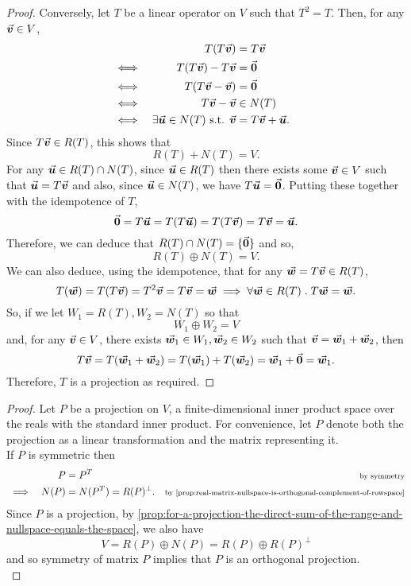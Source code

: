 \documentclass[../MathsNotesBase.tex]{subfiles}
\begin{document}
{\begin{proof}
		\nl
		Conversely, let $T$ be a linear operator on $V$ such that ${ T^2 = T }$. Then, for any ${ \vec{\bm{v}} \in V }$,
		\[\begin{aligned}
			&& T(T\vec{\bm{v}}) &= T\vec{\bm{v}} \\
			&\iff & T(T\vec{\bm{v}}) - T\vec{\bm{v}} &= \vec{\bm{0}} &\text{\scriptsize{}} \\
			&\iff & T(T\vec{\bm{v}} - \vec{\bm{v}}) &= \vec{\bm{0}} &\text{\scriptsize{}} \\
			&\iff & T\vec{\bm{v}} - \vec{\bm{v}} &\in N(T) &\text{\scriptsize{}} \\
			&\iff & \exists \vec{\bm{u}} \in N(T) \text{ s.t. } \vec{\bm{v}} &= T\vec{\bm{v}} + \vec{\bm{u}}.
		\end{aligned}\]
		Since ${ T\vec{\bm{v}} \in R(T) }$, this shows that
		\[ R(T) + N(T) = V. \]
		For any ${ \vec{\bm{u}} \in R(T) \cap N(T) }$, since ${ \vec{\bm{u}} \in R(T) }$ then there exists some ${ \vec{\bm{v}} \in V }$ such that ${ \vec{\bm{u}} = T\vec{\bm{v}} }$ and also, since ${ \vec{\bm{u}} \in N(T) }$, we have ${ T\vec{\bm{u}} = \vec{\bm{0}} }$. Putting these together with the idempotence of $T$,
		\[ \vec{\bm{0}} = T\vec{\bm{u}} = T(T\vec{\bm{u}}) = T(T\vec{\bm{v}}) = T\vec{\bm{v}} = \vec{\bm{u}}. \]
		Therefore, we can deduce that ${ R(T) \cap N(T) = \{\vec{\bm{0}}\} }$ and so,
		\[ R(T) \oplus N(T) = V. \]	
		We can also deduce, using the idempotence, that for any ${ \vec{\bm{w}} = T\vec{\bm{v}} \in R(T) }$,
		\[ T(\vec{\bm{w}}) = T(T\vec{\bm{v}}) = T^2\vec{\bm{v}} = T\vec{\bm{v}} = \vec{\bm{w}} \implies \forall \vec{\bm{w}} \in R(T) \;.\; T\vec{\bm{w}} = \vec{\bm{w}}. \]
		So, if we let ${ W_1 = R(T), W_2 = N(T) }$ so that
		\[ W_1 \oplus W_2 = V \]
		and, for any ${ \vec{\bm{v}} \in V }$, there exists ${ \vec{\bm{w}}_1 \in W_1, \vec{\bm{w}}_2 \in W_2 }$ such that $ \vec{\bm{v}} = \vec{\bm{w}}_1 + \vec{\bm{w}}_2 $, then
		\[ T\vec{\bm{v}} = T(\vec{\bm{w}}_1 + \vec{\bm{w}}_2) = T(\vec{\bm{w}}_1) + T(\vec{\bm{w}}_2) = \vec{\bm{w}}_1 + \vec{\bm{0}} = \vec{\bm{w}}_1. \] 
		Therefore, $T$ is a projection as required.
	\end{proof}


	\bigskip
	\begin{proof}
		Let $P$ be a projection on $V$, a finite-dimensional inner product space over the reals with the standard inner product. For convenience, let $P$ denote both the projection as a linear transformation and the matrix representing it.\\
		
		If $P$ is symmetric then
		\[\begin{aligned}
			&& P &= P^T &\sidecomment{by symmetry}\\
			&\implies & N(P) &= N(P^T) = R(P)^\perp.  &\sidecomment{by \autoref{prop:real-matrix-nullspace-is-orthogonal-complement-of-rowspace}}
		\end{aligned}\]
		Since $P$ is a projection, by \autoref{prop:for-a-projection-the-direct-sum-of-the-range-and-nullspace-equals-the-space}, we also have
		\[ V = R(P) \oplus N(P) = R(P) \oplus R(P)^\perp \]
		and so symmetry of matrix $P$ implies that $P$ is an orthogonal projection.\\
		

\end{proof}}
\end{document}
